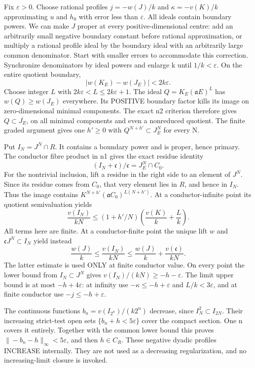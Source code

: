 \documentclass[11pt]{article}
\begin{document}
Fix \(\varepsilon>0\). Choose rational profiles \(j=-w(J)/k\) and \(\kappa=-v(K)/k\) approximating \(u\) and \(h_0\) with error less than \(\varepsilon\). All ideals contain boundary powers. We can make \(J\) proper at every positive-dimensional centre: add an arbitrarily small negative boundary constant before rational approximation, or multiply a rational profile ideal by the boundary ideal with an arbitrarily large common denominator. Start with smaller errors to accommodate this correction. Synchronize denominators by ideal powers and enlarge k until \(1/k<\varepsilon\). On the entire quotient boundary,
\[
|w(K_E)-w(J_E)|<2k\varepsilon.
\]
Choose integer \(L\) with \(2k\varepsilon<L\le2k\varepsilon+1\). The ideal \(Q=K_E(\mathfrak aE)^L\) has \(w(Q)\ge w(J_E)\) everywhere. Its POSITIVE boundary factor kills its image on zero-dimensional minimal components. The exact n2 criterion therefore gives \(Q\subset\overline{J_E}\), on all minimal components and even a nonreduced quotient. The finite graded argument gives one \(h'\ge0\) with \(Q^{N+h'}\subset J_E^N\) for every N.

Put \(I_N=J^N\cap R\). It contains a boundary power and is proper, hence primary. The conductor fibre product in n1 gives the exact residue identity
\[
(I_N+\mathfrak c)/\mathfrak c=J_E^N\cap C_0.
\]
For the nontrivial inclusion, lift a residue in the right side to an element of \(J^N\). Since its residue comes from \(C_0\), that very element lies in \(R\), and hence in \(I_N\). Thus the image contains \(K^{N+h'}(\mathfrak aC_0)^{L(N+h')}\). At a conductor-infinite point its quotient semivaluation yields
\[
\frac{v(I_N)}{kN}\le(1+h'/N)\left(\frac{v(K)}k+\frac Lk\right).
\]
All terms here are finite. At a conductor-finite point the unique lift \(w\) and \(\mathfrak cJ^N\subset I_N\) yield instead
\[
\frac{w(J)}k\le\frac{v(I_N)}{kN}\le\frac{w(J)}k+\frac{v(\mathfrak c)}{kN}.
\]
The latter estimate is used ONLY at finite conductor value. On every point the lower bound from \(I_N\subset J^N\) gives \(v(I_N)/(kN)\ge-h-\varepsilon\). The limit upper bound is at most \(-h+4\varepsilon\): at infinity use \(-\kappa\le-h+\varepsilon\) and \(L/k<3\varepsilon\), and at finite conductor use \(-j\le-h+\varepsilon\).

The continuous functions \(b_n=v(I_{2^n})/(k2^n)\) decrease, since \(I_N^2\subset I_{2N}\). Their increasing strict-test open sets \(\{b_n+h<5\varepsilon\}\) cover the compact section. One n covers it entirely. Together with the common lower bound this proves \(\|-b_n-h\|_\infty<5\varepsilon\), and then \(h\in C_R\). These negative dyadic profiles INCREASE internally. They are not used as a decreasing regularization, and no increasing-limit closure is invoked.
\end{document}
